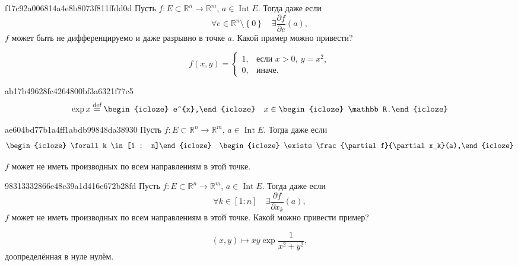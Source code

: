 \begin{note}{f17c92a006814a4e8b8073f811ffdd0d}
    Пусть \({ f : E \subset \mathbb R^{n} \to \mathbb R^{m} }\),\: \({ a \in \operatorname{Int} E }\).
    Тогда даже если
    \[
        \forall e \in \mathbb R^{n} \setminus \left\{ 0 \right\} \quad \exists \frac{\partial f}{\partial e}(a),
    \]
    \({ f }\) может быть не дифференцируемо и даже разрывно в точке \({ a }\).
    Какой пример можно привести?

    \begin{cloze}{1}
        \[
            f(x, y) = \begin{cases}
                1, & \text{если \({ x > 0,\: y = x^2 }\)}, \\
                0, & \text{иначе}.
            \end{cases}
        \]
    \end{cloze}
\end{note}

\begin{note}{ab17b49628fc4264800bf3a6321f77c5}
    \[
        \exp x \overset{\text{def}}= \begin{icloze}{1}e^{x},\end{icloze} \quad x \in \begin{icloze}{2}\mathbb R.\end{icloze}
    \]
\end{note}

\begin{note}{ae604bd77b1a4ff1abdb99848da38930}
    Пусть \({ f : E \subset \mathbb R^{n} \to \mathbb R^{m} }\),\: \({ a \in \operatorname{Int} E }\).
    Тогда даже если
    \[
        \begin{icloze}{3}\forall k \in [1 : n]\end{icloze} \quad \begin{icloze}{2}\exists \frac{\partial f}{\partial x_k}(a),\end{icloze}
    \]
    \begin{icloze}{1}\({ f }\) может не иметь производных по всем направлениям в этой точке.\end{icloze}
\end{note}

\begin{note}{98313332866e48c39a1d416e672b28fd}
    Пусть \({ f : E \subset \mathbb R^{n} \to \mathbb R^{m} }\),\: \({ a \in \operatorname{Int} E }\).
    Тогда даже если
    \[
        \forall k \in [1 : n] \quad \exists \frac{\partial f}{\partial x_k}(a),
    \]
    \({ f }\)  может не иметь производных по всем направлениям в этой точке.
    Какой можно привести пример?

    \begin{cloze}{1}
        \[
            (x, y) \mapsto xy \exp \frac{1}{x^2 + y^2},
        \]
        доопределённая в нуле нулём.
    \end{cloze}
\end{note}

